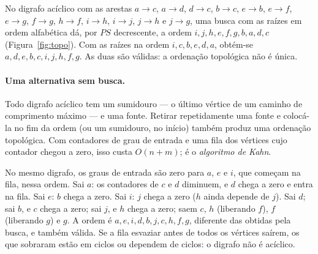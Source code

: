 \begin{exemplo}\label{ex:topo}
No digrafo acíclico com as arestas $a{\to}c$, $a{\to}d$, $d{\to}c$, $b{\to}c$, $e{\to}b$, $e{\to}f$, $e{\to}g$, $f{\to}g$, $h{\to}f$, $i{\to}h$, $i{\to}j$, $j{\to}h$ e $j{\to}g$, uma busca com as raízes em ordem alfabética dá, por $PS$ decrescente, a ordem $i,j,h,e,f,g,b,a,d,c$ (Figura~\ref{fig:topo}). Com as raízes na ordem $i,c,b,e,d,a$, obtém-se $a,d,e,b,c,i,j,h,f,g$. As duas são válidas: a ordenação topológica não é única.
\begin{figura}
\end{figura}
\end{exemplo}

\paragraph{Uma alternativa sem busca.} Todo digrafo acíclico tem um sumidouro --- o último vértice de um caminho de comprimento máximo --- e uma fonte. Retirar repetidamente uma fonte e colocá-la no fim da ordem (ou um sumidouro, no início) também produz uma ordenação topológica. Com contadores de grau de entrada e uma fila dos vértices cujo contador chegou a zero, isso custa $O(n+m)$; é o \emph{algoritmo de Kahn}.

\begin{exemplo}\label{ex:kahn}
No mesmo digrafo, os graus de entrada são zero para $a$, $e$ e $i$, que começam na fila, nessa ordem. Sai $a$: os contadores de $c$ e $d$ diminuem, e $d$ chega a zero e entra na fila. Sai $e$: $b$ chega a zero. Sai $i$: $j$ chega a zero ($h$ ainda depende de $j$). Sai $d$; sai $b$, e $c$ chega a zero; sai $j$, e $h$ chega a zero; saem $c$, $h$ (liberando $f$), $f$ (liberando $g$) e $g$. A ordem é $a,e,i,d,b,j,c,h,f,g$, diferente das obtidas pela busca, e também válida. Se a fila esvaziar antes de todos os vértices saírem, os que sobraram estão em ciclos ou dependem de ciclos: o digrafo não é acíclico.
\end{exemplo}

